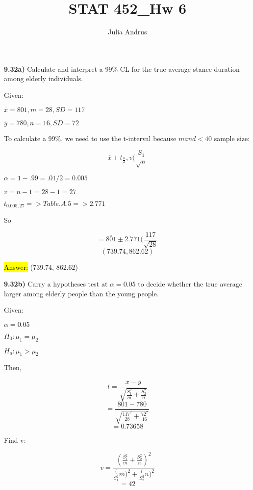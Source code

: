 \documentclass{article}
\title{STAT 452\_Hw 6}
\author{Julia Andrus}
\date{}
\begin{document}
\maketitle 

\textbf{9.32a)} Calculate and interpret a 99\% CL for the true average stance duration among elderly individuals.

\vspace{3mm}

Given: 

$\overline{x}=801, m=28, SD=117$

$\overline{y}=780, n=16, SD=72$

\vspace{3mm}

To calculate a 99\%, we need to use the t-interval because $m and< 40$ sample size:

$$\overline{x} \pm t_{\frac{\alpha}{2}},v(\frac{S_{1}}{\sqrt{n}}$$ 

$\alpha=1-.99=.01/2=0.005$

$v=n-1=28-1=27$

$t_{0.005,27}=> Table.A.5 => 2.771$

\vspace{3mm}

So

$$=\overline{801} \pm 2.771(\frac{117}{\sqrt{28}}$$
$$(739.74, 862.62)$$

\vspace{2mm}


\hl{Answer:} (739.74, 862.62)

\vspace{5mm}

\textbf{9.32b)} Carry a hypotheses test at $\alpha=0.05$ to decide whether the true average larger among elderly people than the young people.

\vspace{3mm}

Given:

 $\alpha=0.05$
 
 $H_{0}: \mu_{1}=\mu_{2}$
 
 $H_{a}: \mu_{1}>\mu_{2}$
 
 Then,
 
 $$t=\frac{\overline{x}-\overline{y}}{\sqrt{\frac{S^{2}_{1}}{m}+{\frac{S^{2}_{2}}{n}}}}$$
 $$=\frac{801-780}{\sqrt{\frac{117^{2}}{28}+{\frac{72^{2}}{16}}}}$$
 $$=0.73658$$
 
 Find v:
 
 $$v=\frac{(\frac{S^{2}_{1}}{m}+\frac{S^{2}_{2}}{n})^{2}}{\frac({S^{2}_{1}}{m})^{2}+\frac({S^{2}_{2}}{n})^{2}}$$
 $$=42$$
 
\end{document}
